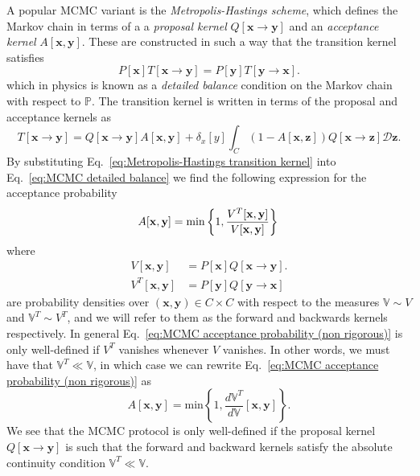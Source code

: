 A popular MCMC variant is the \textit{Metropolis-Hastings scheme}\citep{metropolisEquationStateCalculations1953, hastingsMonteCarloSampling1970}, which defines the Markov chain in terms of a a \textit{proposal kernel} $Q[\mathbf{x} \to \mathbf{y}]$ and an \textit{acceptance kernel} $A[\mathbf{x}, \mathbf{y}]$. These are constructed in such a way that the transition kernel satisfies
\begin{equation} \label{eq:MCMC detailed balance}
P[\mathbf{x}] T[\mathbf{x} \to \mathbf{y}]  = P[\mathbf{y}] T[\mathbf{y} \to \mathbf{x}] .
\end{equation}
which in physics is known as a \textit{detailed balance} condition on the Markov chain with respect to $\mathbb{P}$. The transition kernel is written in terms of the proposal and acceptance kernels as
\begin{equation} \label{eq:Metropolis-Hastings transition kernel}
T[\mathbf{x} \to \mathbf{y}]  = Q[\mathbf{x} \to \mathbf{y}] A[\mathbf{x}, \mathbf{y}] 
+ \delta_{x}[y] \int_C (1 - A[\mathbf{x}, \mathbf{z}]) Q[\mathbf{x} \to \mathbf{z}] \mathcal{D}\mathbf{z}.
\end{equation}
By substituting Eq.~\ref{eq:Metropolis-Hastings transition kernel} into Eq.~\ref{eq:MCMC detailed balance} we find the following expression for the acceptance probability
\begin{equation} \label{eq:MCMC acceptance probability (non rigorous)}
	A[\mathbf{x}, \mathbf{y}] = \text{min}\left\{ 1,
\frac{V^T[\mathbf{x}, \mathbf{y}]}{V[\mathbf{x}, \mathbf{y}]}
\right\} \\
\end{equation}
where
\begin{subequations} \label{eq:forward and backward measures}
\begin{align}
V[\mathbf{x}, \mathbf{y}] & = P[\mathbf{x}] Q[\mathbf{x} \to \mathbf{y}]. \\
V^T[\mathbf{x}, \mathbf{y}] & = P[\mathbf{y}] Q[\mathbf{y} \to \mathbf{x}]
\end{align}
\end{subequations}
are probability densities over $(\mathbf{x}, \mathbf{y}) \in C \times C$ with respect to the measures $\mathbb{V} \sim V$ and $\mathbb{V}^T \sim V^T$, and we will refer to them as the forward and backwards kernels respectively. In general Eq.~\ref{eq:MCMC acceptance probability (non rigorous)} is only well-defined if $V^T$ vanishes whenever $V$ vanishes. In other words, we must have that $\mathbb{V}^T \ll \mathbb{V}$, in which case we can rewrite Eq.~\ref{eq:MCMC acceptance probability (non rigorous)} as
\begin{equation} \label{eq:MCMC acceptance probability}
A[\mathbf{x}, \mathbf{y}] = \text{min}\left\{ 1,
\frac{d \mathbb{V}^T}{d \mathbb{V}}[\mathbf{x}, \mathbf{y}]
\right\}.
\end{equation}
We see that the MCMC protocol is only well-defined if the proposal kernel $Q[\mathbf{x} \to \mathbf{y}]$ is such that the forward and backward kernels satisfy the absolute continuity condition $\mathbb{V}^T \ll \mathbb{V}$.

